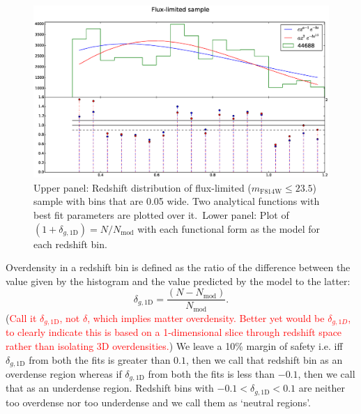 \documentclass[twocolumn,useAMS,usenatbib]{mn2e}
\newcommand{\rachel}[1]{{\textcolor{red}{#1}}}
\begin{document}
\begin{figure}
 \centering
  \includegraphics[width=\columnwidth]{redshift_fluxlimited}
  \caption{Upper panel: Redshift distribution of flux-limited ($m_\text{F814W}\le 23.5$) sample with bins that are 0.05 wide. Two analytical functions with best fit parameters are plotted over it.\
           Lower panel: Plot of $(1+\delta_{g,\text{1D}}) = N/N_{\text{mod}}$ with each functional form as the model for each redshift bin.}
  \label{fig:redshift_fluxlimited}
\end{figure}

Overdensity in a redshift bin is defined as the ratio of the
difference between the value given by the histogram and the value
predicted by the model to the latter:
\begin{equation}
\delta_{g,\text{1D}}=\frac{(N-N_{\text{mod}})}{N_{\text{mod}}}.  
\end{equation}
(\rachel{Call it $\delta_{g,\text{1D}}$, not $\delta$, which implies matter
  overdensity.  Better yet would be $\delta_{g,1D}$, to clearly
  indicate this is based on a 1-dimensional slice through redshift
  space rather than isolating 3D overdensities.})
We leave a 10\% margin of safety i.e. iff $\delta_{g,\text{1D}}$ from both the fits is greater than $0.1$, then we call that redshift bin as an
overdense region whereas if $\delta_{g,\text{1D}}$ from both the fits is less than $-0.1$, then we call that as an underdense region. Redshift bins with $-0.1 < \delta_{g,\text{1D}} < 0.1$ are neither too overdense
nor too underdense and we call them as `neutral regions'.
\end{document}
